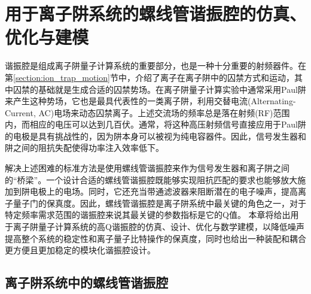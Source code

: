 
\chapter[用于离子阱系统的高Q螺线管谐振腔的仿真、优化与建模]{用于离子阱系统的螺线管谐振腔的仿真、优化与建模\label{section:helical}}
谐振腔是组成离子阱量子计算系统的重要部分，也是一种十分重要的射频器件。在第\ref{section:ion_trap_motion}节中，介绍了离子在离子阱中的囚禁方式和运动，其中囚禁的基础就是生成合适的囚禁势场。在离子阱量子计算实验中通常采用Paul阱来产生这种势场，它也是最具代表性的一类离子阱，利用交替电流(Alternating-Current, AC)电场来动态囚禁离子。上述交流场的频率总是落在射频(RF)范围内，而相应的电压可以达到几百伏。通常，将这种高压射频信号直接应用于Paul阱的电极是具有挑战性的，因为阱本身可以被视为纯电容器件。因此，信号发生器和阱之间的阻抗失配使得功率注入效率低下。

解决上述困难的标准方法是使用螺线管谐振腔来作为信号发生器和离子阱之间的“桥梁”。一个设计合适的螺线管谐振腔既能够实现阻抗匹配的要求也能够放大施加到阱电极上的电场。同时，它还充当带通滤波器来阻断潜在的电子噪声，提高离子量子门的保真度。因此，螺线管谐振腔是离子阱系统中最关键的角色之一，对于特定频率需求范围的谐振腔来说其最关键的参数指标是它的Q值。
本章将给出用于离子阱量子计算系统的高Q谐振腔的仿真、设计、优化与数学建模，以降低噪声提高整个系统的稳定性和离子量子比特操作的保真度\cite[]{van_Dijk_Kawakami_Schouten_Veldhorst_Vandersypen_Babaie_Charbon_Sebastiano_2019}，同时也给出一种装配和耦合更方便且更加稳定的模块化谐振腔设计。




\section[离子阱系统中的螺线管谐振腔]{离子阱系统中的螺线管谐振腔}



